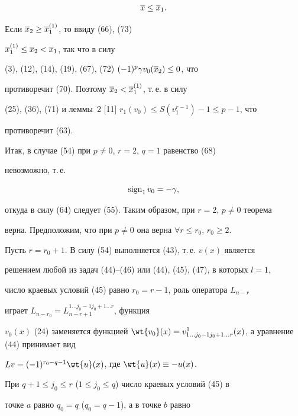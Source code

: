 \begin{pf}
\begin{equation}
\o{x}\le\o{x}_1.


\end{equation}





Если $\overline{x}_2\ge\overline{x}_1^{(1)}$, то ввиду (66), (73)


$\overline{x}_1^{(1)}\le\overline{x}_2<\overline{x}_1$, так что в силу


(3), (12), (14), (19), (67), (72) $(-1)^p\gamma v_0(\overline{x}_2)\le 0$, что


противоречит (70). Поэтому $\overline{x}_2<\overline{x}_1^{(1)}$, т.\,е. в силу


(25), (36), (71) и леммы~2 [11] $r_1(v_0)\le S(v_1^{r-1})-1\le p-1$, что


противоречит (63).





Итак, в случае (54) при $p\ne 0$, $r=2$, $q=1$ равенство (68)


невозможно, т.\,е.


\begin{equation}


\sign_1v_0=-\gamma,


\end{equation}


откуда в силу (64) следует (55). Таким образом, при $r=2$, $p\ne 0$ теорема


верна. Предположим, что при $p\ne 0$ она верна $\forall r\le r_0$, $r_0\ge 2$.





Пусть $r=r_0+1$. В силу (54) выполняется (43), т.\,е. $v(x)$ является 


решением любой из задач (44)--(46) или (44), (45), (47), в которых $l=1$,


число краевых условий (45) равно $r_0=r-1$, роль оператора $L_{n-r}$


играет $L_{n-r_0}=L^{1\dotsc j_0-1 j_0+1\dotsc r}_{n-r+1}$, функция


$v_0(x)$ (24) заменяется функцией $\wt{v_0}(x)=v^1_{1\dotsc j_0-1


j_0+1\dotsc r}(x)$, а уравнение (44) принимает вид


$Lv=(-1)^{r_0-q-1}\wt{u}(x)$, где $\wt{u}(x)\equiv -u(x)$.





При $q+1\le j_0\le r$ ($1\le j_0\le q$) число краевых условий (45) в


точке $a$ равно $q_0=q$ ($q_0=q-1$), а в точке $b$ равно



\end{pf}
